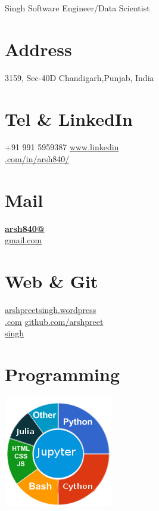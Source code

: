 \documentclass[]{friggeri-cv}
\begin{document}
     {Singh}
      {Software Engineer/Data Scientist}
      

\begin{aside}
  \section{Address}
    3159, Sec-40D
    Chandigarh,Punjab, India
    ~
  \section{Tel \& LinkedIn}
    +91 991 5959387
    \href{http://www.linkedin.com/in/arsh840/}{www.linkedin\\.com/in/arsh840/}
    ~
  \section{Mail}
    \href{mailto:arsh840@gmail.com}{\textbf{arsh840@}\\gmail.com}
    ~
  \section{Web \& Git}
    \href{http://www.arshpreetsingh.wordpress.com}{arshpreetsingh.wordpress\\.com}
    \href{https://github.com/arshpreetsingh}{github.com/arshpreet\\singh}
    ~
  \section{Programming}
    \includegraphics[scale=0.62]{img/programming.png}
    ~

\end{aside}
\end{document}
